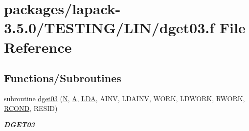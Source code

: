 \hypertarget{dget03_8f}{}\section{packages/lapack-\/3.5.0/\+T\+E\+S\+T\+I\+N\+G/\+L\+I\+N/dget03.f File Reference}
\label{dget03_8f}
\subsection*{Functions/\+Subroutines}
\begin{DoxyCompactItemize}
\item 
subroutine \hyperlink{group__double__lin_ga7579624d597091d14fc7ca25b7782038}{dget03} (\hyperlink{polmisc_8c_a0240ac851181b84ac374872dc5434ee4}{N}, \hyperlink{classA}{A}, \hyperlink{example__user_8c_ae946da542ce0db94dced19b2ecefd1aa}{L\+D\+A}, A\+I\+N\+V, L\+D\+A\+I\+N\+V, W\+O\+R\+K, L\+D\+W\+O\+R\+K, R\+W\+O\+R\+K, \hyperlink{superlu__enum__consts_8h_af00a42ecad444bbda75cde1b64bd7e72a9b5c151728d8512307565994c89919d5}{R\+C\+O\+N\+D}, R\+E\+S\+I\+D)
\begin{DoxyCompactList}\small\item\em {\bfseries D\+G\+E\+T03} \end{DoxyCompactList}\end{DoxyCompactItemize}

